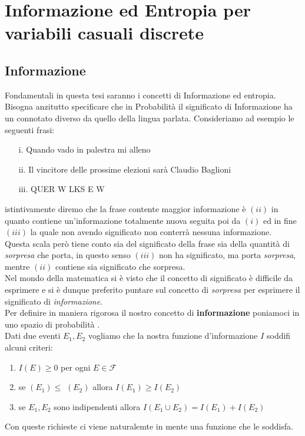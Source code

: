 \chapter{Informazione ed Entropia per variabili casuali discrete}
\label{cha:intro}




\section{Informazione}
\label{sec:informazione}
Fondamentali in questa tesi saranno i concetti di Informazione ed entropia.\\
Bisogna anzitutto specificare che in Probabilità il significato di Informazione ha un connotato diverso da quello della lingua parlata. Consideriamo ad esempio le seguenti frasi: 
\begin{enumerate}
\item[i.] Quando vado in palestra mi alleno
\item[ii.] Il vincitore delle prossime elezioni sarà Claudio Baglioni
\item[iii.] QUER W LKS E W
\end{enumerate}

istintivamente diremo che la frase contente maggior informazione è $(ii)$ in quanto contiene un'informazione totalmente nuova seguita poi da $(i)$ ed in fine $(iii)$ la quale non avendo significato non conterrà nessuna informazione.\\ Questa scala però tiene conto sia del significato della frase sia della quantità di \textit{sorpresa} che porta, in questo senso $(iii)$ non ha significato, ma porta \textit{sorpresa}, mentre $(ii)$ contiene sia significato che sorpresa.\\ Nel mondo della matematica si è visto che il concetto di significato è difficile da esprimere e si è dunque preferito puntare sul concetto di \textit{sorpresa} per esprimere il significato di \textit{informazione}.\\
Per definire in maniera rigorosa il nostro concetto di \textbf{informazione} poniamoci in uno spazio di probabilità \spacep.\\
Dati due eventi $E_1,E_2$ vogliamo che la nostra funzione d'informazione $I$ soddifi alcuni criteri:

\begin{enumerate} 
\item $I(E)\geq 0$ per ogni $E\in \mathcal{F}$
\item se \p$(E_1)\leq $ \p$(E_2)$ allora $I(E_1)\geq I(E_2)$ 
\item se $E_1,E_2$ sono indipendenti allora $I(E_1\cup E_2)=I(E_1)+ I(E_2)$
\end{enumerate} 
Con queste richieste ci viene naturalemte in mente una funzione che le soddisfa.

